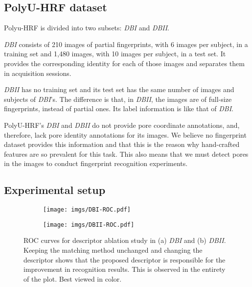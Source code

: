 \documentclass[10pt,twocolumn,letterpaper]{article}
\begin{document}
\subsection{PolyU-HRF dataset}
\label{sec:dataset}
Polyu-HRF is divided into two subsets: \textit{DBI} and \textit{DBII}.

\textit{DBI} consists of 210 images of partial fingerprints, with 6 images per subject, in a training set and 1,480 images, with 10 images per subject, in a test set.
It provides the corresponding identity for each of those images and separates them in acquisition sessions.

\textit{DBII} has no training set and its test set has the same number of images and subjects of \textit{DBI}'s.
The difference is that, in \textit{DBII}, the images are of full-size fingerprints, instead of partial ones.
Its label information is like that of \textit{DBI}.

PolyU-HRF's \textit{DBI} and \textit{DBII} do not provide pore coordinate annotations, and, therefore, lack pore identity annotations for its images.
We believe no fingerprint dataset provides this information and that this is the reason why hand-crafted features are so prevalent for this task.
This also means that we must detect pores in the images to conduct fingerprint recognition experiments.

\subsection{Experimental setup}

\begin{figure*}
    \begin{subfigure}{0.5\linewidth}
      \texttt{[image: imgs/DBI-ROC.pdf]}
      \caption{\label{fig:roc1}}
    \end{subfigure}
    \begin{subfigure}{0.5\linewidth}
      \texttt{[image: imgs/DBII-ROC.pdf]}
      \caption{\label{fig:roc2}}
    \end{subfigure}
  \caption{ROC curves for descriptor ablation study in (a) \textit{DBI} and (b) \textit{DBII}.
  Keeping the matching method unchanged and changing the descriptor shows that the proposed descriptor is responsible for the improvement in recognition results.
  This is observed in the entirety of the plot.
  Best viewed in color.}
  \label{fig:rocs}
\end{figure*}
\end{document}
